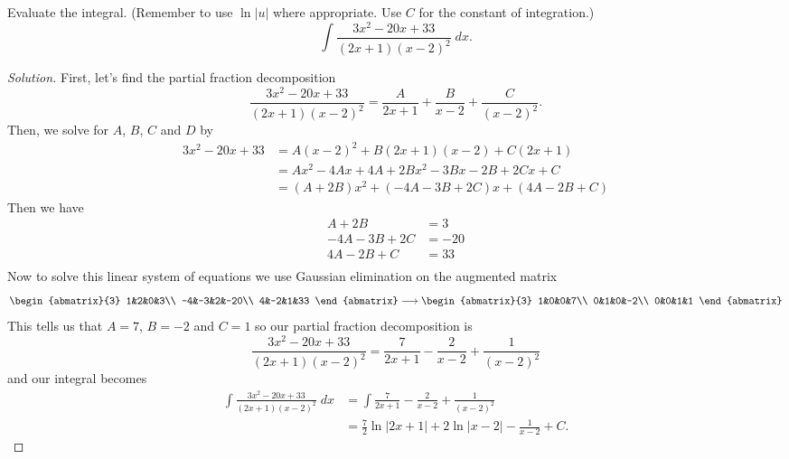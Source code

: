 \begin{problem}[WebAssign, HW 13, \# 6]
Evaluate the integral. (Remember to use $\ln|u|$ where appropriate. Use $C$
for the constant of integration.)
\[
\int\frac{3x^2-20x+33}{(2x+1)(x-2)^2}\;dx.
\]
\end{problem}
\begin{proof}[Solution]
First, let's find the partial fraction decomposition
\[
\frac{3x^2-20x+33}{(2x+1)(x-2)^2}
=\frac{A}{2x+1}+\frac{B}{x-2}+\frac{C}{(x-2)^2}.
\]
Then, we solve for $A$, $B$, $C$ and $D$ by
\begin{align*}
3x^2-20x+33&=A(x-2)^2+B(2x+1)(x-2)+C(2x+1)\\
&=Ax^2-4Ax+4A+2Bx^2-3Bx-2B+2Cx+C\\
&=(A+2B)x^2+(-4A-3B+2C)x+(4A-2B+C)
\end{align*}
Then we have
\begin{align*}
A+2B&=3\\
-4A-3B+2C&=-20\\
4A-2B+C&=33\\
\end{align*}
Now to solve this linear system of equations we use Gaussian elimination on
the augmented matrix
$$
\begin{abmatrix}{3}
1&2&0&3\\
-4&-3&2&-20\\
4&-2&1&33
\end{abmatrix}
\longrightarrow
\begin{abmatrix}{3}
1&0&0&7\\
0&1&0&-2\\
0&0&1&1
\end{abmatrix}
$$
This tells us that $A=7$, $B=-2$ and $C=1$ so our partial fraction
decomposition is
\[
\frac{3x^2-20x+33}{(2x+1)(x-2)^2}
=\frac{7}{2x+1}-\frac{2}{x-2}+\frac{1}{(x-2)^2}
\]
and our integral becomes
\begin{align*}
\int\frac{3x^2-20x+33}{(2x+1)(x-2)^2}\;dx
&=
\int\frac{7}{2x+1}-\frac{2}{x-2}+\frac{1}{(x-2)^2}\\
&=\boxed{\frac{7}{2}\ln|2x+1|+2\ln|x-2|-\frac{1}{x-2}+C.}
\end{align*}
\end{proof}


